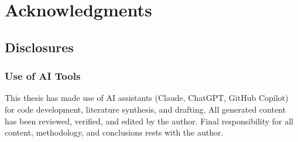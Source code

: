 \chapter*{Acknowledgments}

%








\section*{Disclosures}

\subsection*{Use of AI Tools}
This thesis has made use of AI assistants (Claude, ChatGPT, GitHub Copilot) 
for code development, literature synthesis, and drafting. All generated 
content has been reviewed, verified, and edited by the author. Final 
responsibility for all content, methodology, and conclusions rests 
with the author.

